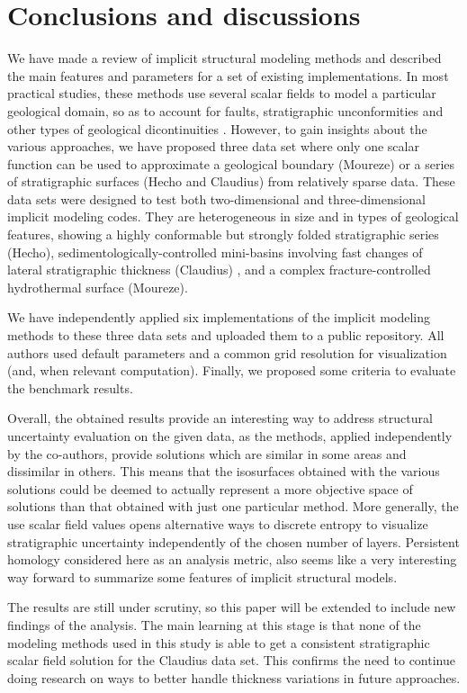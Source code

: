 \documentclass[preprint]{ring20}
\begin{document}
\section*{Conclusions and discussions}
\label{sec:conclu}
We have made a review of implicit structural modeling methods and described the main features and parameters for a set of existing implementations. In most practical studies, these methods use several scalar fields to model a particular geological domain, so as to account for faults, stratigraphic unconformities and other types of geological dicontinuities \citep{Wellmann2018AiG}. However, to gain insights about the various approaches, we have proposed three data set where only one scalar function can be used to approximate a geological boundary (Moureze) or a series of stratigraphic surfaces (Hecho and Claudius) from relatively sparse data. 
These data sets were designed to test both two-dimensional and three-dimensional implicit modeling codes. They are heterogeneous in size and in types of geological features, showing a highly conformable but strongly folded stratigraphic series (Hecho), sedimentologically-controlled mini-basins involving fast changes of lateral stratigraphic thickness (Claudius) , and a complex fracture-controlled hydrothermal surface (Moureze). 

We have independently applied six implementations of the implicit modeling methods to these three data sets and uploaded them to a public repository. All authors used default parameters and a common grid resolution for visualization (and, when relevant computation). Finally, we proposed some criteria to evaluate the benchmark results. 

Overall, the obtained results provide an interesting way to address structural uncertainty evaluation on the given data, as the methods, applied independently by the co-authors, provide solutions which are similar in some areas and dissimilar in others. This means that the isosurfaces obtained with the various solutions could be deemed to actually represent a more objective space of solutions than that obtained with just one particular method. More generally, the use scalar field values opens alternative ways to discrete entropy to visualize stratigraphic uncertainty independently of the chosen number of layers. Persistent homology considered here as an analysis metric, also seems like a very interesting way forward to summarize some features of implicit structural models.  

The results are still under scrutiny, so this paper will be extended to include new findings of the analysis. The main learning at this stage is that none of the modeling methods used in this study is able to get a consistent stratigraphic scalar field solution for the Claudius data set. This confirms the need to continue doing research on ways to better handle thickness variations in future approaches. 
\end{document}

